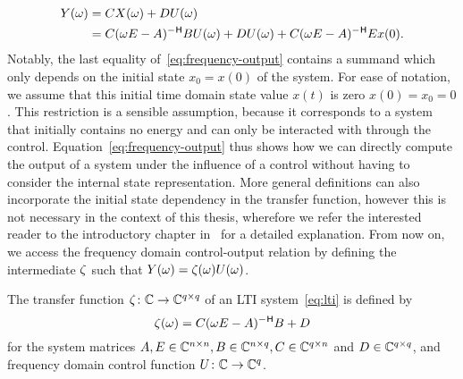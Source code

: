 \begin{equation}\label{eq:frequency-output}
    \begin{aligned}
        Y(\omega) &= C X(\omega) + D U(\omega) \\
        &= C (\omega E - A)\inv B U(\omega) + D U(\omega) + C (\omega E - A)\inv E x(0).
    \end{aligned}
\end{equation}
Notably, the last equality of~\eqref{eq:frequency-output} contains a summand which only depends on the initial state $x_0 = x(0)$ of the system.
For ease of notation, we assume that this initial time domain state value $x(t)$ is zero $x(0) = x_0 = 0$.
This restriction is a sensible assumption, because it corresponds to a system that initially contains no energy and can only be interacted with through the control.
Equation~\eqref{eq:frequency-output} thus shows how we can directly compute the output of a system under the influence of a control without having to consider the internal state representation.
More general definitions can also incorporate the initial state dependency in the transfer function, however this is not necessary in the context of this thesis, wherefore we refer the interested reader to the introductory chapter in~\cite{Benner2017} for a detailed explanation.
From now on, we access the frequency domain control-output relation by defining the intermediate $\zeta$ such that $Y(\omega) = \zeta(\omega) U(\omega)$.

\begin{definition}\label{def:transfer-function}
    The transfer function $\zeta \colon \mathbb{C} \to \mathbb{C}^{q \times q}$ of an \ac{LTI} system~\eqref{eq:lti} is defined by
    \begin{equation}\label{eq:transfer-function}
        \tfunc(\omega) = C (\omega E - A)\inv B + D
    \end{equation}
    for the system matrices $A, E \in \mathbb{C}^{n \times n}, B \in \mathbb{C}^{n \times q}, C \in \mathbb{C}^{q \times n}$ and $D \in \mathbb{C}^{q \times q}$, and frequency domain control function $U \colon \mathbb{C} \to \mathbb{C}^{q}$.
\end{definition}


